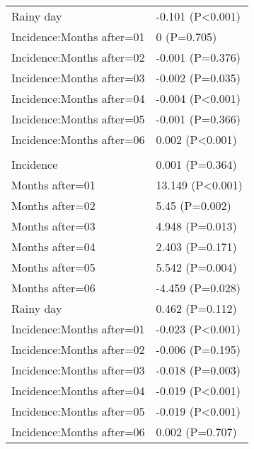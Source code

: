 \documentclass[]{article}
\begin{document}
\begin{longtable}[t]{ll}
\hspace{1em}Rainy day & -0.101 (P<0.001)\\
\hspace{1em}Incidence:Months after=01 & 0 (P=0.705)\\
\hspace{1em}Incidence:Months after=02 & -0.001 (P=0.376)\\
\hspace{1em}Incidence:Months after=03 & -0.002 (P=0.035)\\
\hspace{1em}Incidence:Months after=04 & -0.004 (P<0.001)\\
\hspace{1em}Incidence:Months after=05 & -0.001 (P=0.366)\\
\hspace{1em}Incidence:Months after=06 & 0.002 (P<0.001)\\
\addlinespace[1.5em]
\multicolumn{2}{l}{\textbf{Temporary not field worker}}\\
\hspace{1em}Incidence & 0.001 (P=0.364)\\
\hspace{1em}Months after=01 & 13.149 (P<0.001)\\
\hspace{1em}Months after=02 & 5.45 (P=0.002)\\
\hspace{1em}Months after=03 & 4.948 (P=0.013)\\
\hspace{1em}Months after=04 & 2.403 (P=0.171)\\
\hspace{1em}Months after=05 & 5.542 (P=0.004)\\
\hspace{1em}Months after=06 & -4.459 (P=0.028)\\
\hspace{1em}Rainy day & 0.462 (P=0.112)\\
\hspace{1em}Incidence:Months after=01 & -0.023 (P<0.001)\\
\hspace{1em}Incidence:Months after=02 & -0.006 (P=0.195)\\
\hspace{1em}Incidence:Months after=03 & -0.018 (P=0.003)\\
\hspace{1em}Incidence:Months after=04 & -0.019 (P<0.001)\\
\hspace{1em}Incidence:Months after=05 & -0.019 (P<0.001)\\
\hspace{1em}Incidence:Months after=06 & 0.002 (P=0.707)\\*
\end{longtable}
\end{document}
